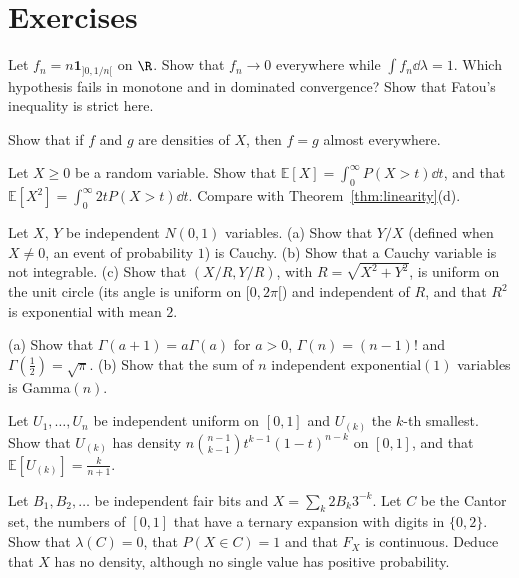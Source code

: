 \section{Exercises}

\begin{exercise}[$\star$]\label{ex:counter}
Let $f_n=n\mathbf 1_{]0,1/n[}$ on $\R$. Show that $f_n\to0$ everywhere while $\int f_n\dd\lambda=1$. Which hypothesis fails in monotone and in
dominated convergence? Show that Fatou's inequality is strict here.
\end{exercise}

\begin{exercise}[$\star$]\label{ex:densityunique}
Show that if $f$ and $g$ are densities of $X$, then $f=g$ almost everywhere.
\end{exercise}

\begin{exercise}[$\star\star$]\label{ex:tail}
Let $X\ge0$ be a random variable. Show that $\mathbb E[X]=\int_0^\infty P(X>t)\dd t$, and that $\mathbb E[X^2]=\int_0^\infty2tP(X>t)\dd t$. Compare with
Theorem~\ref{thm:linearity}(d).
\end{exercise}

\begin{exercise}[$\star\star$]\label{ex:cauchy}
Let $X$, $Y$ be independent $N(0,1)$ variables. (a) Show that $Y/X$ (defined when $X\ne0$, an event of probability $1$) is Cauchy. (b) Show that a
Cauchy variable is not integrable. (c) Show that $(X/R,Y/R)$, with $R=\sqrt{X^2+Y^2}$, is uniform on the unit circle (its angle is
uniform on $[0,2\pi[$) and independent of $R$, and that $R^2$ is exponential with mean $2$.
\end{exercise}

\begin{exercise}[$\star\star$]\label{ex:gamma}
(a) Show that $\Gamma(a+1)=a\Gamma(a)$ for $a>0$, $\Gamma(n)=(n-1)!$ and $\Gamma(\frac12)=\sqrt\pi$. (b) Show that the sum of $n$ independent
exponential$(1)$ variables is Gamma$(n)$.
\end{exercise}

\begin{exercise}[$\star\star$]\label{ex:order}
Let $U_1,\dots,U_n$ be independent uniform on $[0,1]$ and $U_{(k)}$ the $k$-th smallest. Show that $U_{(k)}$ has density
$n\binom{n-1}{k-1}t^{k-1}(1-t)^{n-k}$ on $[0,1]$, and that $\mathbb E[U_{(k)}]=\frac k{n+1}$.
\end{exercise}

\begin{exercise}[$\star\star$]\label{ex:cantor}
Let $B_1,B_2,\ldots$ be independent fair bits and $X=\sum_k2B_k3^{-k}$. Let $C$ be the Cantor set, the numbers of $[0,1]$ that have a
ternary expansion with digits in $\{0,2\}$. Show that $\lambda(C)=0$, that $P(X\in C)=1$ and that $F_X$ is continuous. Deduce that $X$ has no
density, although no single value has positive probability.
\end{exercise}

